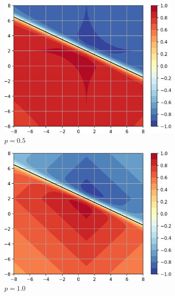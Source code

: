 \documentclass[12pt,oneside]{CUNY_PhD}
\begin{document}
\begin{figure}[!htbp]
    \centering
    \begin{subfigure}[t]{0.32\textwidth}
        \includegraphics[width=\textwidth]{images/Variants-Norms/ord0.5-cropped.png}
        \caption*{$p=0.5$}
    \end{subfigure}
    \begin{subfigure}[t]{0.32\textwidth}
        \includegraphics[width=\textwidth]{images/Variants-Norms/ord1-cropped.png}
        \caption*{$p=1.0$}
    \end{subfigure}
    \begin{subfigure}[t]{0.32\textwidth}

\end{subfigure}
\end{figure}
\end{document}
